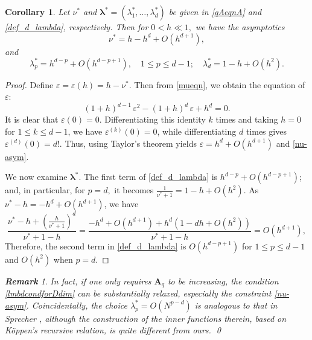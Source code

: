 \documentclass[10pt,reqno,final]{amsart}
\newtheorem{cor}{\bf Corollary}
\newenvironment{corollary}{\begin{cor}} {\end{cor}}
\theoremstyle{remark}
\newtheorem{rem}{\bf Remark}[section]
\theoremstyle{definition}
\newcommand{\bs}[1]{\boldsymbol{#1}}
\begin{document}
\begin{corollary}\label{lamda-small} Let $\nu^*$ and  $\bs \lambda^*=(\lambda_1^*,\ldots,\lambda_d^*)$ be given in \eqref{qAeqnA} and \eqref{def_d_lambda}, respectively. Then for  $0<h\ll 1,$  we have the asymptotics
 \begin{equation}\label{nu-asym}
 \nu^*=h-h^d+O(h^{d+1}), 
 \end{equation}
 and 
 \begin{equation}\label{lamda-asym}
 \lambda_p^*=h^{d-p}+O(h^{d-p+1}),\quad  1\le p\le d-1;\quad  
 \lambda_d^*=1-h+O(h^2).
 \end{equation}
\end{corollary}
\begin{proof} Define $\varepsilon=\varepsilon(h)=h-\nu^*.$ Then from \eqref{mueqn}, we obtain the equation of $\varepsilon:$
$$(1+h)^{d-1}\,\varepsilon^2-(1+h)^d\,\varepsilon+h^d=0.$$
It is clear that  \(\varepsilon(0)=0\). Differentiating this identity \(k\) times and taking \(h=0\) for \(1\le k\le d-1\), 
 we have $\varepsilon^{(k)}(0)=0$,
while differentiating \(d\) times gives
$\varepsilon^{(d)}(0)=d!.$
Thus, using Taylor's theorem yields
$\varepsilon=h^d+O(h^{d+1})$
and \eqref{nu-asym}.

We now examine $\bs \lambda^*$. The first term of \eqref{def_d_lambda} is $h^{d-p}+O(h^{d-p+1})$; and, in particular, for $p=d,$ it becomes $\tfrac{1}{\nu^*+1}=1-h+O(h^2).$ 
As $\nu^*-h=-h^d+O(h^{d+1})$, we have
$$\frac{\nu^*-h+(\frac{h}{\nu^*+1})^d}{\nu^*+1-h}
=\frac{-h^d+O(h^{d+1})+h^d(1-dh+O(h^2))}{\nu^*+1-h}=O(h^{d+1}),$$
Therefore, the second term in \eqref{def_d_lambda} is $O(h^{d-p+1})$ for $1\le p\le d-1$ and $O(h^2)$ when $p=d$.
\end{proof}

\begin{rem}\label{Cond-lambda} {\em In fact, if one only requires $\bs A_q$ to be increasing, the condition
\eqref{lmbdcondforDdim} can be substantially relaxed, especially the constraint
\eqref{nu-asym}. Coincidentally, the choice
$\lambda_p^*=O(N^{p-d})$ is analogous to that in Sprecher
\cite{Sprecher1997numerical}, although the construction of the inner functions
therein, based on K\"oppen's recursive relation, is quite different from ours. \qed}
\end{rem}
\end{document}
